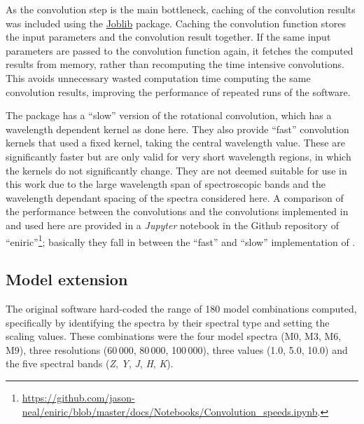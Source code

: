 As the convolution step is the main bottleneck, caching of the convolution results was included using the \href{https://joblib.readthedocs.io}{Joblib} package.
Caching the convolution function stores the input parameters and the convolution result together.
If the same input parameters are passed to the convolution function again, it fetches the computed results from memory, rather than recomputing the time intensive convolutions.
This avoids unnecessary wasted computation time computing the same convolution results, improving the performance of repeated runs of the software.

The \pyastronomy{} package has a ``slow'' version of the rotational convolution, which has a wavelength dependent kernel as done here.
They also provide ``fast'' convolution kernels that used a fixed kernel, taking the central wavelength value.
These are significantly faster but are only valid for very short wavelength regions, in which the kernels do not significantly change.
They are not deemed suitable for use in this work due to the large wavelength span of spectroscopic bands and the wavelength dependant spacing of the spectra considered here.
A comparison of the performance between the \pyastronomy{} convolutions and the convolutions implemented in \eniric{} and used here are provided in a \emph{Jupyter} notebook in the Github repository of ``eniric''\footnote{\href{https://github.com/jason-neal/eniric/blob/master/docs/Notebooks/Convolution_speeds.ipynb}{https://github.com/jason-neal/eniric/blob/master/docs/Notebooks/Convolution\_speeds.ipynb}.}; basically they fall in between the ``fast'' and ``slow'' implementation of \pyastronomy{}.


\subsection{Model extension}
\label{subsec:eniric_model_extesion}
The original software hard-coded the range of 180 model combinations computed, specifically by identifying the spectra by their spectral type and setting the \snr{} scaling values.
These combinations were the four model spectra (M0, {M3}, {M6}, {M9}), three resolutions (60\,000, 80\,000, 100\,000), three \Vsini{} values (1.0, 5.0, 10.0\kmps{}) and the five spectral bands (\emph{Z}, \emph{Y}, \emph{J}, \emph{H}, \emph{K}).

